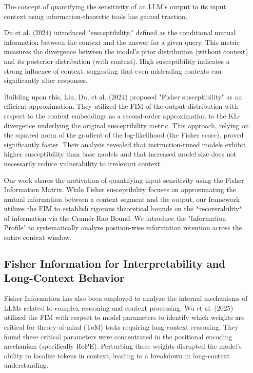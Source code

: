 \documentclass{article}
\theoremstyle{definition}
\begin{document}
The concept of quantifying the sensitivity of an LLM's output to its input context using information-theoretic tools has gained traction.

Du et al. (2024) \cite{du2024context} introduced "susceptibility," defined as the conditional mutual information between the context and the answer for a given query. This metric measures the divergence between the model's prior distribution (without context) and its posterior distribution (with context). High susceptibility indicates a strong influence of context, suggesting that even misleading contexts can significantly alter responses.

Building upon this, Liu, Du, et al. (2024) \cite{liu2024efficiently} proposed "Fisher susceptibility" as an efficient approximation. They utilized the FIM of the output distribution with respect to the context embeddings as a second-order approximation to the KL-divergence underlying the original susceptibility metric. This approach, relying on the squared norm of the gradient of the log-likelihood (the Fisher score), proved significantly faster. Their analysis revealed that instruction-tuned models exhibit higher susceptibility than base models and that increased model size does not necessarily reduce vulnerability to irrelevant context.

Our work shares the motivation of quantifying input sensitivity using the Fisher Information Matrix. While Fisher susceptibility focuses on approximating the mutual information between a context segment and the output, our framework utilizes the FIM to establish rigorous theoretical bounds on the *recoverability* of information via the Cramér-Rao Bound. We introduce the "Information Profile" to systematically analyze position-wise information retention across the entire context window.

\subsection{Fisher Information for Interpretability and Long-Context Behavior}

Fisher Information has also been employed to analyze the internal mechanisms of LLMs related to complex reasoning and context processing. Wu et al. (2025) \cite{wu2025theoryofmind} utilized the FIM with respect to model parameters to identify which weights are critical for theory-of-mind (ToM) tasks requiring long-context reasoning. They found these critical parameters were concentrated in the positional encoding mechanism (specifically RoPE). Perturbing these weights disrupted the model's ability to localize tokens in context, leading to a breakdown in long-context understanding.
\end{document}
